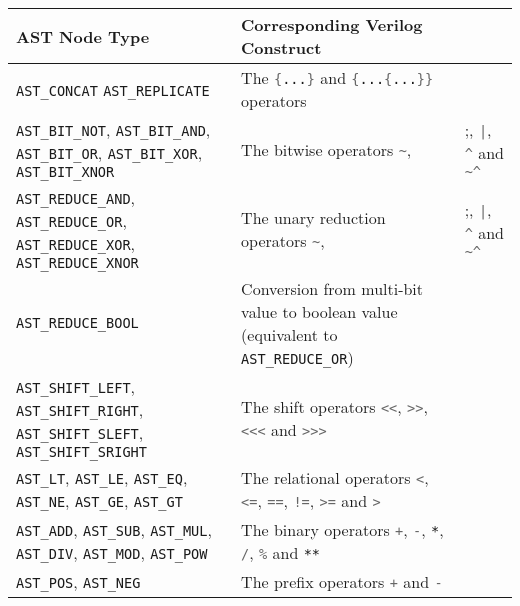 \begin{table}[t!]
\ContinuedFloat
\hfil
\begin{tabular}{>{\raggedright\arraybackslash}p{7cm}>{\raggedright\arraybackslash}p{8cm}}
AST Node Type & Corresponding Verilog Construct \\
\hline
\hline
{}
{\tt AST\_CONCAT}
{\tt AST\_REPLICATE} &
The \lstinline[language=Verilog];{...}; and
\lstinline[language=Verilog];{...{...}}; operators \\
\hline
%
{\tt AST\_BIT\_NOT},
{\tt AST\_BIT\_AND},
{\tt AST\_BIT\_OR},
{\tt AST\_BIT\_XOR},
{\tt AST\_BIT\_XNOR} &
The bitwise operators \break
\lstinline[language=Verilog];~;,
\lstinline[language=Verilog];&;,
\lstinline[language=Verilog];|;,
\lstinline[language=Verilog];^; and
\lstinline[language=Verilog];~^; \\
\hline
%
{\tt AST\_REDUCE\_AND},
{\tt AST\_REDUCE\_OR},
{\tt AST\_REDUCE\_XOR},
{\tt AST\_REDUCE\_XNOR} &
The unary reduction operators \break
\lstinline[language=Verilog];~;,
\lstinline[language=Verilog];&;,
\lstinline[language=Verilog];|;,
\lstinline[language=Verilog];^; and
\lstinline[language=Verilog];~^; \\
\hline
%
{\tt AST\_REDUCE\_BOOL} &
Conversion from multi-bit value to boolean value
(equivalent to {\tt AST\_REDUCE\_OR}) \\
\hline
%
{\tt AST\_SHIFT\_LEFT},
{\tt AST\_SHIFT\_RIGHT},
{\tt AST\_SHIFT\_SLEFT},
{\tt AST\_SHIFT\_SRIGHT} &
The shift operators \break
\lstinline[language=Verilog];<<;,
\lstinline[language=Verilog];>>;,
\lstinline[language=Verilog];<<<; and
\lstinline[language=Verilog];>>>; \\
\hline
%
{\tt AST\_LT},
{\tt AST\_LE},
{\tt AST\_EQ},
{\tt AST\_NE},
{\tt AST\_GE},
{\tt AST\_GT} &
The relational operators \break
\lstinline[language=Verilog];<;,
\lstinline[language=Verilog];<=;,
\lstinline[language=Verilog];==;,
\lstinline[language=Verilog];!=;,
\lstinline[language=Verilog];>=; and
\lstinline[language=Verilog];>; \\
\hline
%
{\tt AST\_ADD},
{\tt AST\_SUB},
{\tt AST\_MUL},
{\tt AST\_DIV},
{\tt AST\_MOD},
{\tt AST\_POW} &
The binary operators \break
\lstinline[language=Verilog];+;,
\lstinline[language=Verilog];-;,
\lstinline[language=Verilog];*;,
\lstinline[language=Verilog];/;,
\lstinline[language=Verilog];%; and
\lstinline[language=Verilog];**; \\
\hline
%
{\tt AST\_POS},
{\tt AST\_NEG} &
The prefix operators
\lstinline[language=Verilog];+; and
\lstinline[language=Verilog];-; \\

\end{tabular}
\end{table}
